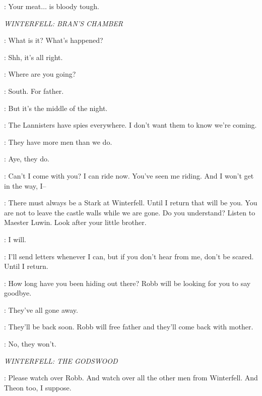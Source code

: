 \UMBER:  Your meat$\ldots$ is bloody tough. 


\scene

\textit{WINTERFELL: BRAN'S CHAMBER} 


\BRAN: What is it? What's happened? 

\ROBB: Shh, it's all right. 

\BRAN: Where are you going? 

\ROBB: South. For father. 

\BRAN: But it's the middle of the night. 

\ROBB: The Lannisters have spies everywhere. I don't want them to know we're coming. 

\BRAN: They have more men than we do. 

\ROBB: Aye, they do. 

\BRAN: Can't I come with you? I can ride now. You've seen me riding. And I won't get in the way, I--  

\ROBB: There must always be a Stark at Winterfell. Until I return that will be you. You are not to leave the castle walls while we are gone. Do you understand? Listen to Maester Luwin. Look after your little brother. 

\BRAN: I will. 

\ROBB: I'll send letters whenever I can, but if you don't hear from me, don't be scared. Until I return. 


\BRAN: How long have you been hiding out there? Robb will be looking for you to say goodbye. 

\RICKON: They've all gone away. 

\BRAN: They'll be back soon. Robb will free father and they'll come back with mother. 

\RICKON: No, they won't. 


\scene

\textit{WINTERFELL: THE GODSWOOD} 


\BRAN: Please watch over Robb. And watch over all the other men from Winterfell. And Theon too, I suppose. 


